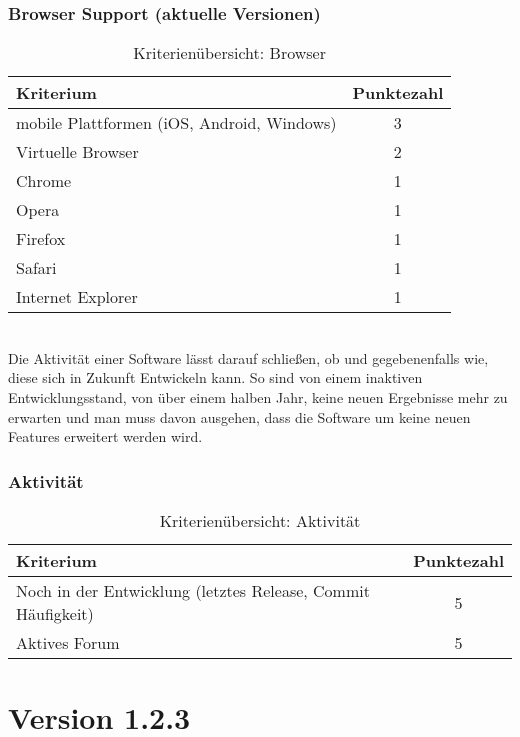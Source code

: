 \subsubsection{Browser Support (aktuelle Versionen)} 
\begin{table}[H]
 	\vspace{-30pt}
 	\centering
		\begin{tabular}{| p{12cm} | c|}
			\hline
				Kriterium		 &	Punktezahl\\
			\hline
			\hline
				mobile Plattformen (iOS, Android, Windows)			&3\\
				Virtuelle Browser	&	2	\\
				Chrome				&	1	\\
				Opera				&	1	\\
				Firefox				&	1	\\
				Safari				&	1	\\
				Internet Explorer		&	1	\\
				\hline
		\end{tabular}
	\caption{Kriterienübersicht: Browser}
\end{table}

\\Die Aktivität einer Software lässt darauf schließen, ob und gegebenenfalls wie, diese sich in Zukunft Entwickeln kann. So sind von einem inaktiven Entwicklungsstand, von über einem halben Jahr, keine neuen Ergebnisse mehr zu erwarten und man muss davon ausgehen, dass die Software um keine neuen Features erweitert werden wird.
\subsubsection{Aktivität}
\begin{table}[H]
 	\vspace{-30pt}
 	\centering
		\begin{tabular}{| p{12cm} | c|}
			\hline
				Kriterium		 &	Punktezahl\\
			\hline
			\hline
				Noch in der Entwicklung (letztes Release, Commit Häufigkeit)			&5\\
				Aktives Forum	&	5	\\
				\hline
		\end{tabular}
	\caption{Kriterienübersicht: Aktivität}
\end{table}



	\pagebreak
	\section{ Version 1.2.3}
